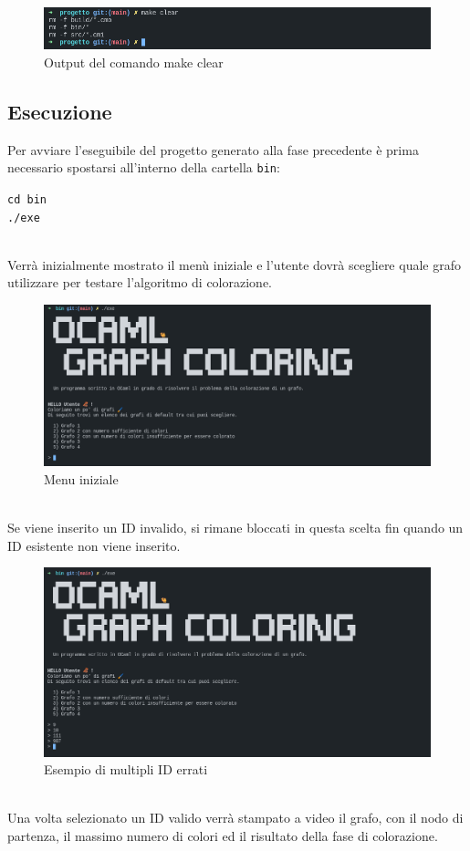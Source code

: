 \begin{figure}[H]
	\centering
	\includegraphics[width=\textwidth]{img/makeclear.png}
	\caption{Output del comando make clear}
\end{figure}

\subsection{Esecuzione}

Per avviare l'eseguibile del progetto generato alla fase precedente è prima necessario spostarsi all'interno della cartella \lstinline[style=cmd]|bin|:

\begin{center}
	\lstinline[style=cmd]|cd bin|\\
	\lstinline[style=cmd]|./exe  |
\end{center}
\ \\
Verrà inizialmente mostrato il menù iniziale e l'utente dovrà scegliere quale grafo utilizzare per testare l'algoritmo di colorazione.

\begin{figure}[H]
	\centering
	\includegraphics[width=\textwidth]{img/menu.png}
	\caption{Menu iniziale}
\end{figure}
\ \\
Se viene inserito un ID invalido, si rimane bloccati in questa scelta fin quando un ID esistente non viene inserito.

\begin{figure}[H]
	\centering
	\includegraphics[width=\textwidth]{img/badid.png}
	\caption{Esempio di multipli ID errati}
\end{figure}
\ \\
Una volta selezionato un ID valido verrà stampato a video il grafo, con il nodo di partenza, il massimo numero di colori ed il risultato della fase di colorazione.

